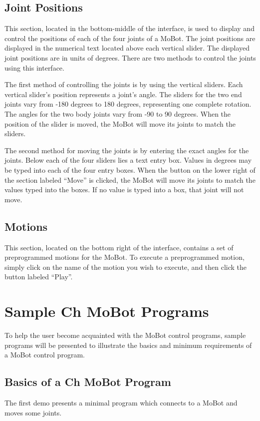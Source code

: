 \documentclass{article}
\begin{document}
\subsection{Joint Positions}
This section, located in the bottom-middle of the interface, is used to display
and control the positions of each of the four
joints of a MoBot. The joint positions are displayed in the numerical
text located above each vertical slider. The displayed joint positions are in
units of degrees.  There are two methods to control
the joints using this interface.

The first method of controlling the joints is by using the vertical sliders.
Each vertical slider's position represents a joint's angle. The sliders for the
two end joints vary from -180 degrees to 180 degrees, representing one complete
rotation. The angles for the two body joints vary from -90 to 90 degrees. When
the position of the slider is moved, the MoBot will move its joints to match the 
sliders. 

The second method for moving the joints is by entering the exact angles for the
joints. Below each of the four sliders lies a text entry box. Values in degrees
may be typed into each of the four entry boxes. When the button on the lower
right of the section labeled ``Move'' is clicked, the MoBot will move its joints
to match the values typed into the boxes. If no value is typed into a box, that 
joint will not move.

\subsection{Motions}
This section, located on the bottom right of the interface, contains a set of
preprogrammed motions for the MoBot. To execute a preprogrammed motion, simply
click on the name of the motion you wish to execute, and then click the button
labeled ``Play''.

\section{Sample Ch MoBot Programs}
To help the user become acquainted with the MoBot control programs, sample
programs will be presented to illustrate the basics and minimum requirements of
a MoBot control program. 

\subsection{Basics of a Ch MoBot Program}
The first demo presents a minimal program which connects to a MoBot and
moves some joints.
\end{document}
